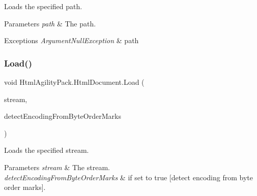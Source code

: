 Loads the specified path. 


\begin{DoxyParams}{Parameters}
{\em path} & The path.\\
\hline
\end{DoxyParams}

\begin{DoxyExceptions}{Exceptions}
{\em Argument\+Null\+Exception} & path\\
\hline
\end{DoxyExceptions}
\mbox{\label{class_html_agility_pack_1_1_html_document_a36fde208dfaee7e0cc75a3ea8ec48689}} 
\subsubsection{\texorpdfstring{Load()}{Load()}\hspace{0.1cm}{\footnotesize\ttfamily [4/11]}}
{\footnotesize\ttfamily void Html\+Agility\+Pack.\+Html\+Document.\+Load (\begin{DoxyParamCaption}\item[{Stream}]{stream,  }\item[{bool}]{detect\+Encoding\+From\+Byte\+Order\+Marks }\end{DoxyParamCaption})\hspace{0.3cm}{\ttfamily [inline]}}



Loads the specified stream. 


\begin{DoxyParams}{Parameters}
{\em stream} & The stream.\\
\hline
{\em detect\+Encoding\+From\+Byte\+Order\+Marks} & if set to {\ttfamily true} \mbox{[}detect encoding from byte order marks\mbox{]}.\\
\hline
\end{DoxyParams}
\mbox{\label{class_html_agility_pack_1_1_html_document_aea2fcb410174b92f6671d8a5a02ff07d}} 
